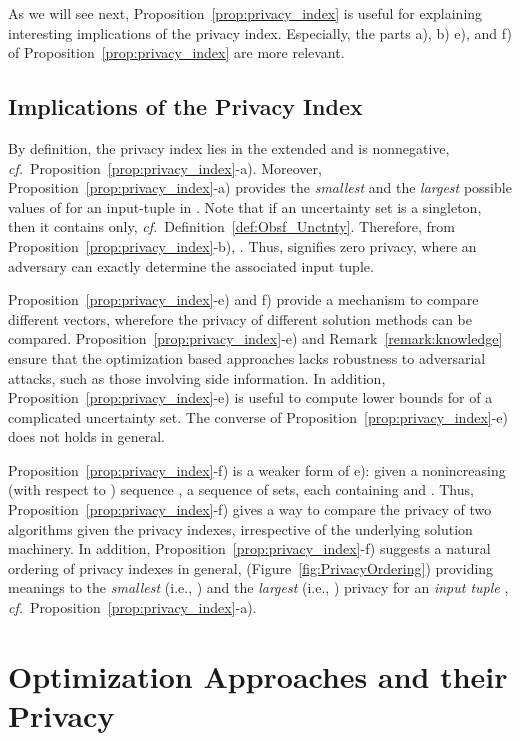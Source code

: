 \documentclass[12pt,draftcls,onecolumn]{IEEEtran}
\newcommand{\cf}{{\textit{cf.}}}
\newcommand{\addnew}[1]{{{\color{blue!0!black}#1}}}
\begin{document}
\addnew{As we will see next, Proposition~\ref{prop:privacy_index} is useful for explaining interesting implications of the privacy index. Especially, the parts a), b) e), and f) of Proposition~\ref{prop:privacy_index} are more relevant.}

\addnew
{
\subsection{Implications of the Privacy Index}\label{subsec:privacyIndex}
}

\addnew
{
By definition, the privacy index  lies in the extended  and is nonnegative, \cf~Proposition~\ref{prop:privacy_index}-a). Moreover, Proposition~\ref{prop:privacy_index}-a) provides the \emph{smallest} and the \emph{largest} possible values of  for an input-tuple in . Note that if an uncertainty set  is a singleton, then it contains  only, \cf~Definition~\ref{def:Obsf_Unctnty}. Therefore, from Proposition~\ref{prop:privacy_index}-b), . Thus,  signifies zero privacy, where an adversary can exactly determine the associated input tuple.

Proposition~\ref{prop:privacy_index}-e) and f) provide a mechanism to compare different  vectors, wherefore the privacy of different solution methods can be compared. Proposition~\ref{prop:privacy_index}-e) and Remark~\ref{remark:knowledge} ensure that the optimization based approaches lacks robustness to adversarial attacks, such as those involving side information. In addition, Proposition~\ref{prop:privacy_index}-e) is useful to compute lower bounds for  of a complicated uncertainty set. The converse of Proposition~\ref{prop:privacy_index}-e) does not holds in general.

Proposition~\ref{prop:privacy_index}-f) is a weaker form of e): given a nonincreasing (with respect to ) sequence ,  a sequence  of sets, each containing  and . Thus, Proposition~\ref{prop:privacy_index}-f) gives a way to compare the privacy of two algorithms given the privacy indexes, irrespective of the underlying solution machinery. In addition, Proposition~\ref{prop:privacy_index}-f) suggests a natural ordering of privacy indexes in general, (Figure~\ref{fig:PrivacyOrdering}) providing meanings to the \emph{smallest} (i.e., ) and the \emph{largest} (i.e., ) privacy for an \emph{input tuple} , \cf~Proposition~\ref{prop:privacy_index}-a).
}

\vspace{3mm}
\section{{Optimization Approaches and their Privacy}}\label{sec:Opt_Approaches_Privacy}
\end{document}

